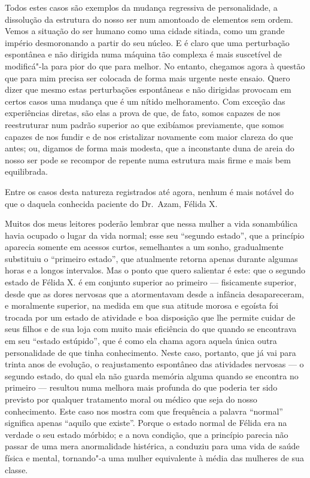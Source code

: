 Todos estes casos são exemplos da mudança regressiva de personalidade, a
dissolução da estrutura do nosso ser num amontoado de elementos sem
ordem. Vemos a situação do ser humano como uma cidade sitiada, como um
grande império desmoronando a partir do seu núcleo. E é claro que uma
perturbação espontânea e não dirigida numa máquina tão complexa é mais
suscetível de modificá"-la para pior do que para melhor. No entanto,
chegamos agora à questão que para mim precisa ser colocada de forma
mais urgente neste ensaio.  Quero dizer que mesmo estas perturbações
espontâneas e não dirigidas provocam em certos casos uma mudança  que é
um nítido melhoramento.  Com exceção das experiências diretas, são elas
a prova de que, de fato, somos capazes de nos reestruturar num padrão
superior ao que exibíamos previamente, que somos capazes de nos fundir
e de nos cristalizar novamente com maior clareza do que antes; ou,
digamos de forma mais modesta, que a inconstante duna de areia do nosso
ser pode se recompor de repente numa estrutura mais firme e mais bem
equilibrada.

Entre os casos desta natureza registrados até agora, nenhum é mais 
notável do que o daquela conhecida paciente do Dr.~Azam, Félida X.

Muitos dos meus leitores poderão lembrar que nessa mulher a vida
sonambúlica havia ocupado o lugar da vida normal; esse seu “segundo
estado”, que a princípio aparecia somente em acessos curtos,
semelhantes a um sonho, gradualmente substituiu o “primeiro estado”,
que atualmente retorna apenas durante algumas horas e a longos
intervalos.  Mas o ponto que quero salientar é este: que o segundo
estado de Félida X. é em conjunto superior ao primeiro --- fisicamente
superior, desde que as dores nervosas que a atormentavam desde a
infância desapareceram, e moralmente superior, na medida em que sua
atitude morosa e egoísta foi trocada por um estado de atividade e boa
disposição que lhe permite cuidar de seus filhos e de sua loja com
muito mais eficiência do que quando se encontrava em seu “estado
estúpido”, que é como ela chama agora aquela única outra personalidade
de que tinha conhecimento. Neste caso, portanto, que já vai para trinta
anos de evolução, o reajustamento espontâneo das atividades nervosas 
--- o segundo estado, do qual ela não guarda memória alguma quando se
encontra no primeiro --- resultou numa melhora mais profunda do que
poderia ter sido previsto por qualquer tratamento moral ou médico que
seja do nosso conhecimento.  Este caso nos mostra com que frequência a
palavra “normal” significa apenas “aquilo que existe”. Porque o estado
normal de Félida era na verdade o seu estado mórbido; e a nova
condição, que a princípio parecia não passar de uma mera anormalidade
histérica, a conduziu para uma vida de saúde física e mental,
tornando"-a uma mulher equivalente à média das mulheres de sua classe.  

